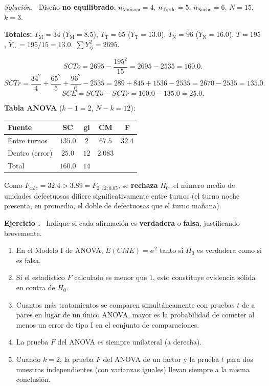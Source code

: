 \documentclass[11pt,a4paper]{article}
\newcounter{ejnum}
\newenvironment{ejercicio}{\refstepcounter{ejnum}\par\medskip\noindent\textbf{Ejercicio \theejnum.}~}{\par}
\newenvironment{solucion}{\par\noindent\textit{Solución.}~}{\par\vspace{1em}}
\begin{document}
\begin{solucion}
Diseño \textbf{no equilibrado}: $n_{\text{Mañana}}=4$, $n_{\text{Tarde}}=5$, $n_{\text{Noche}}=6$, $N=15$, $k=3$.

\textbf{Totales:} $T_{\text{M}}=34$ ($\bar Y_{\text{M}}=8.5$), $T_{\text{T}}=65$ ($\bar Y_{\text{T}}=13.0$), $T_{\text{N}}=96$ ($\bar Y_{\text{N}}=16.0$). $T=195$, $\bar Y_{\cdot\cdot}=195/15=13.0$. $\sum Y_{ij}^2=2695$.

\[
SCTo=2695-\frac{195^2}{15}=2695-2535=160.0.
\]
\[
SCTr=\frac{34^2}{4}+\frac{65^2}{5}+\frac{96^2}{6}-2535=289+845+1536-2535=2670-2535=135.0.
\]
\[
SCE=SCTo-SCTr=160.0-135.0=25.0.
\]

\textbf{Tabla ANOVA} ($k-1=2$, $N-k=12$):
\begin{table}[htbp]
\centering
\begin{tabular}{lcccc}
\toprule
Fuente & SC & gl & CM & F \\
\midrule
Entre turnos & $135.0$ & $2$ & $67.5$ & $32.4$ \\
Dentro (error) & $25.0$ & $12$ & $2.083$ & \\
\midrule
Total & $160.0$ & $14$ & & \\
\bottomrule
\end{tabular}
\end{table}

Como $F_{\text{calc}}=32.4 > 3.89=F_{2,12;0.05}$, se \textbf{rechaza} $H_0$: el número medio de unidades defectuosas difiere significativamente entre turnos (el turno noche presenta, en promedio, el doble de defectuosas que el turno mañana).
\end{solucion}

\begin{ejercicio}
Indique si cada afirmación es \textbf{verdadera} o \textbf{falsa}, justificando brevemente.
\begin{enumerate}[label=(\alph*)]
\item En el Modelo I de ANOVA, $E(CME)=\sigma^2$ tanto si $H_0$ es verdadera como si es falsa.
\item Si el estadístico $F$ calculado es menor que $1$, esto constituye evidencia sólida en contra de $H_0$.
\item Cuantos más tratamientos se comparen simultáneamente con pruebas $t$ de a pares en lugar de un único ANOVA, mayor es la probabilidad de cometer al menos un error de tipo I en el conjunto de comparaciones.
\item La prueba $F$ del ANOVA es siempre unilateral (a derecha).
\item Cuando $k=2$, la prueba $F$ del ANOVA de un factor y la prueba $t$ para dos muestras independientes (con varianzas iguales) llevan siempre a la misma conclusión.
\end{enumerate}
\end{ejercicio}
\end{document}
